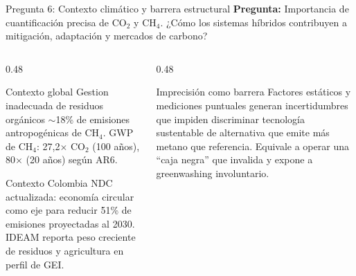 \documentclass[aspectratio=169, 11pt]{beamer}
\newcommand{\MRV}{\text{MRV}}
\begin{document}
\begin{frame}{Pregunta 6: Contexto climático y barrera estructural}
\textbf{Pregunta:} Importancia de cuantificación precisa de CO$_2$ y CH$_4$. ¿Cómo los sistemas híbridos contribuyen a mitigación, adaptación y mercados de carbono?

\vspace{0.3cm}
\begin{columns}[T]
\begin{column}{0.48\textwidth}
\begin{block}{Contexto global}
\footnotesize
Gestion inadecuada de residuos orgánicos $\sim$18\% de emisiones antropogénicas de CH$_4$. GWP de CH$_4$: 27,2$\times$ CO$_2$ (100 años), 80$\times$ (20 años) según AR6.
\end{block}
\begin{block}{Contexto Colombia}
\footnotesize
NDC actualizada: economía circular como eje para reducir 51\% de emisiones proyectadas al 2030. IDEAM reporta peso creciente de residuos y agricultura en perfil de GEI.
\end{block}
\end{column}
\begin{column}{0.48\textwidth}
\begin{alertblock}{Imprecisión como barrera}
\footnotesize
Factores estáticos y mediciones puntuales generan incertidumbres que impiden discriminar tecnología sustentable de alternativa que emite más metano que referencia. Equivale a operar una ``caja negra'' que invalida \MRV{} y expone a greenwashing involuntario.
\end{alertblock}
\end{column}
\end{columns}
\end{frame}
\end{document}
